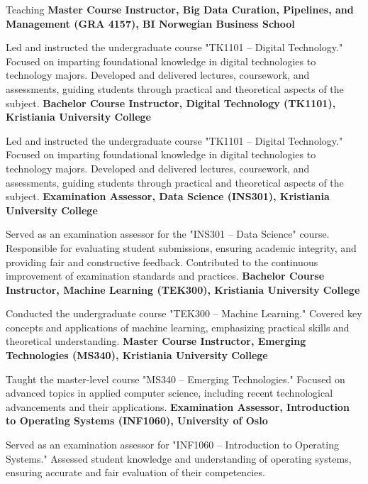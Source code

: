 \documentclass[a4paper,skipsamekey,10pt,english]{curve}
\begin{document}
\begin{rubric}{Teaching}
\entry*[2023]%
\textbf{Master Course Instructor, Big Data Curation, Pipelines, and Management (GRA 4157), BI Norwegian Business School} \par
Led and instructed the undergraduate course "TK1101 – Digital Technology."
Focused on imparting foundational knowledge in digital technologies to technology majors.
Developed and delivered lectures, coursework, and assessments, guiding students through practical and theoretical aspects of the subject.
%
\entry*[2020]%
\textbf{Bachelor Course Instructor, Digital Technology (TK1101), Kristiania University College} \par
Led and instructed the undergraduate course "TK1101 – Digital Technology."
Focused on imparting foundational knowledge in digital technologies to technology majors.
Developed and delivered lectures, coursework, and assessments, guiding students through practical and theoretical aspects of the subject.
%
\entry*[2019]%
\textbf{Examination Assessor, Data Science (INS301), Kristiania University College} \par
Served as an examination assessor for the "INS301 – Data Science" course.
Responsible for evaluating student submissions, ensuring academic integrity, and providing fair and constructive feedback.
Contributed to the continuous improvement of examination standards and practices.
%
\entry*[2019]%
\textbf{Bachelor Course Instructor, Machine Learning (TEK300), Kristiania University College} \par
Conducted the undergraduate course "TEK300 – Machine Learning."
Covered key concepts and applications of machine learning, emphasizing practical skills and theoretical understanding.
%
\entry*[2019]%
\textbf{Master Course Instructor, Emerging Technologies (MS340), Kristiania University College} \par
Taught the master-level course "MS340 – Emerging Technologies."
Focused on advanced topics in applied computer science, including recent technological advancements and their applications.
%
\entry*[2019]%
\textbf{Examination Assessor, Introduction to Operating Systems (INF1060), University of Oslo} \par
Served as an examination assessor for "INF1060 – Introduction to Operating Systems."
Assessed student knowledge and understanding of operating systems, ensuring accurate and fair evaluation of their competencies.
\end{rubric}
\end{document}
